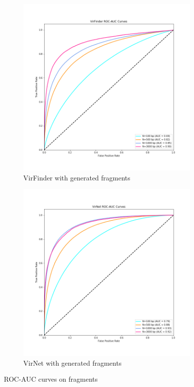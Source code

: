 \begin{figure}[!htbp]
	\centering
	\begin{subfigure}{0.5\textwidth}
		\includegraphics[width=\linewidth]{Pictures/roc_auc.png}
		\caption{VirFinder with generated fragments} 
		\label{fig:roc_auc_virfindera}
	\end{subfigure}
	\begin{subfigure}{0.5\textwidth}
		\includegraphics[width=\linewidth]{Pictures/virnet_roc_auc.png}
		\caption{VirNet with generated fragments} 
		\label{fig:roc_auc_virneta}
	\end{subfigure}
	\caption{ROC-AUC curves on fragments} 
	\label{fig:roc_auc_virfinder}
\end{figure}


